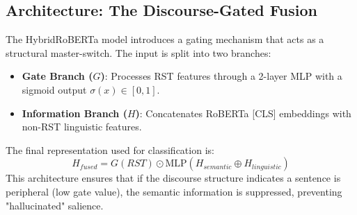 \documentclass[11pt,a4paper]{article}
\begin{document}
\subsection{Architecture: The Discourse-Gated Fusion}
The HybridRoBERTa model introduces a gating mechanism that acts as a structural master-switch. The input is split into two branches:
\begin{itemize}
    \item \textbf{Gate Branch ($G$)}: Processes RST features through a 2-layer MLP with a sigmoid output $\sigma(x) \in [0, 1]$.
    \item \textbf{Information Branch ($H$)}: Concatenates RoBERTa [CLS] embeddings with non-RST linguistic features.
\end{itemize}
The final representation used for classification is:
\begin{equation}
    H_{fused} = G(RST) \odot \text{MLP}(H_{semantic} \oplus H_{linguistic})
\end{equation}
This architecture ensures that if the discourse structure indicates a sentence is peripheral (low gate value), the semantic information is suppressed, preventing "hallucinated" salience.
\end{document}
